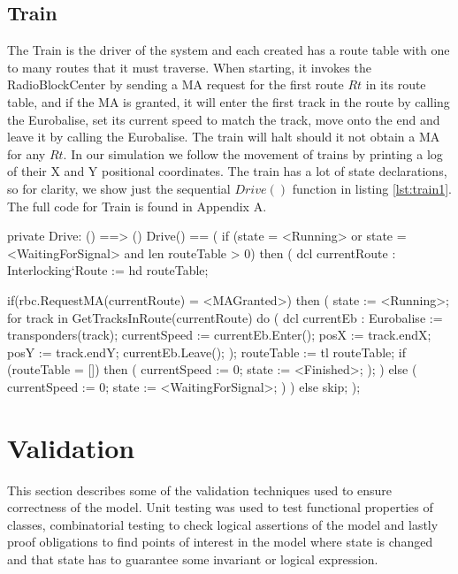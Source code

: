 \documentclass[preprint,12pt]{elsarticle}
\begin{document}
\subsection{Train}

The Train is the driver of the system and each created has a route table with one to many routes that it must traverse. When starting, it invokes the RadioBlockCenter by sending a MA request for the first route $Rt$ in its route table, and if the MA is granted, it will enter the first track in the route by calling the Eurobalise, set its current speed to match the track, move onto the end and leave it by calling the Eurobalise. The train will halt should it not obtain a MA for any $Rt$. In our simulation we follow the movement of trains by printing a log of their X and Y positional coordinates. The train has a lot of state declarations, so for clarity, we show just the sequential $Drive()$ function in listing \ref{lst:train1}. The full code for Train is found in Appendix A.

\begin{vdmsl}[label=lst:train1,caption={Drive() moves the train along a sequence of routes, requests MA for each route and obeys track speed limits.}]
	private Drive: () ==> ()
	Drive() ==
	(
	if (state = <Running> or state = <WaitingForSignal>
		and len routeTable > 0) then (
			dcl currentRoute : Interlocking`Route := hd routeTable;
			
			if(rbc.RequestMA(currentRoute) = <MAGranted>)
			then (
				state := <Running>;
				for track in GetTracksInRoute(currentRoute) do (
					dcl currentEb : Eurobalise := transponders(track);
					currentSpeed := currentEb.Enter();
					posX := track.endX;
					posY := track.endY;
					currentEb.Leave();
				);
			routeTable := tl routeTable;
			if (routeTable = []) then (
				currentSpeed := 0;
				state := <Finished>;
			);
		) else (
		currentSpeed := 0;
		state := <WaitingForSignal>;
		)
	) else skip;
	);
\end{vdmsl}

\section{Validation}

This section describes some of the validation techniques used to ensure correctness of the model. Unit testing was used to test functional properties of classes, combinatorial testing to check logical assertions of the model and lastly proof obligations to find points of interest in the model where state is changed and that state has to guarantee some invariant or logical expression.
\end{document}
